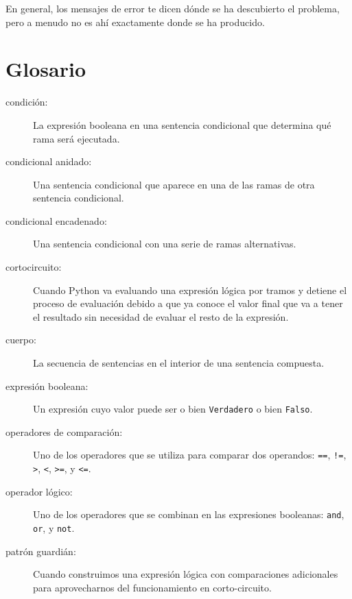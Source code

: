 
En general, los mensajes de error te dicen dónde se ha descubierto el problema,
pero a menudo no es ahí exactamente donde se ha producido.


\section{Glosario}

\begin{description}

\item[condición:] La expresión booleana en una sentencia condicional
que determina qué rama será ejecutada.

\item[condicional anidado:]  Una sentencia condicional que aparece
en una de las ramas de otra sentencia condicional.

\item[condicional encadenado:]  Una sentencia condicional con una serie
de ramas alternativas.
	
\item[cortocircuito:]  Cuando Python va evaluando una expresión lógica
por tramos y detiene el proceso de evaluación debido a que ya
conoce el valor final que va a tener el resultado
sin necesidad de evaluar el resto de la expresión.

\item[cuerpo:] La secuencia de sentencias en el interior de una sentencia compuesta.

\item[expresión booleana:]  Un expresión cuyo valor puede ser o bien 
{\tt Verdadero} o bien {\tt Falso}.

\item[operadores de comparación:] Uno de los operadores que se utiliza para comparar
dos operandos: {\tt ==}, {\tt !=}, {\tt \verb">"}, {\tt \verb"<"}, {\tt \verb">="}, y {\tt \verb"<="}.

\item[operador lógico:] Uno de los operadores que se combinan en las expresiones
booleanas: {\tt and}, {\tt or}, y {\tt not}.

\item[patrón guardián:] Cuando construimos una expresión lógica
con comparaciones adicionales
para aprovecharnos del funcionamiento en corto-circuito.


\end{description}
